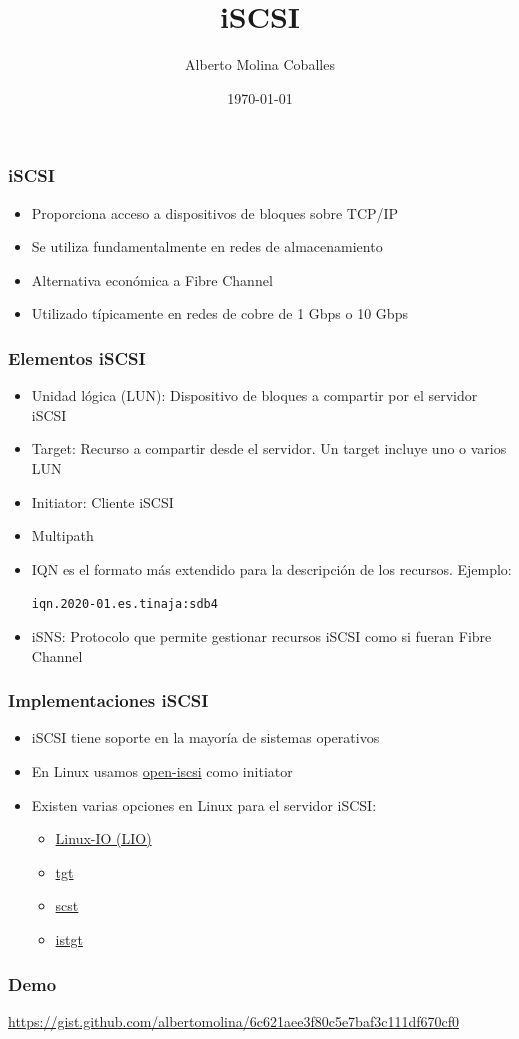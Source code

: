 \documentclass[aspectratio=169]{beamer}
\author{Alberto Molina Coballes}
\title{iSCSI}
\institute{IES Gonzalo Nazareno}
\date{\today}
\begin{document}
\def\braces#1{[#1]}

\begin{frame}[t,plain]
\titlepage
\end{frame}

\begin{frame}
  \frametitle{iSCSI}
  \begin{itemize}
  \item Proporciona acceso a dispositivos de bloques sobre TCP/IP
  \item Se utiliza fundamentalmente en redes de almacenamiento
  \item Alternativa económica a Fibre Channel
  \item Utilizado típicamente en redes de cobre de 1 Gbps o 10 Gbps
  \end{itemize}
\end{frame}

\begin{frame}
  \frametitle{Elementos iSCSI}
  \begin{itemize}
  \item Unidad lógica (LUN): Dispositivo de bloques a compartir por el servidor iSCSI
  \item Target: Recurso a compartir desde el servidor. Un target incluye uno o varios LUN
  \item Initiator: Cliente iSCSI
  \item Multipath
  \item IQN es el formato más extendido para la descripción de los recursos. Ejemplo:

    \texttt{iqn.2020-01.es.tinaja:sdb4}
  \item iSNS: Protocolo que permite gestionar recursos iSCSI como si fueran Fibre Channel
  \end{itemize}
\end{frame}

\begin{frame}
  \frametitle{Implementaciones iSCSI}
  \begin{itemize}
  \item iSCSI tiene soporte en la mayoría de sistemas operativos
  \item En Linux usamos
    \href{https://github.com/open-iscsi/open-iscsi}{open-iscsi} como
    initiator
  \item Existen varias opciones en Linux para el servidor iSCSI:
    \begin{itemize}
    \item \href{http://linux-iscsi.org/wiki/Main_Page}{Linux-IO (LIO)}
    \item \href{http://stgt.sourceforge.net/}{tgt}
    \item \href{http://scst.sourceforge.net/}{scst}
    \item \href{http://www.peach.ne.jp/archives/istgt/}{istgt}
    \end{itemize}
  \end{itemize}
\end{frame}

\begin{frame}
  \frametitle{Demo}
  \small{\url{https://gist.github.com/albertomolina/6c621aee3f80c5e7baf3c111df670cf0}}
\end{frame}
\end{document}
